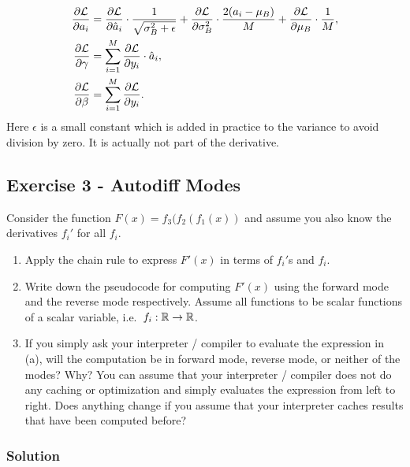 \documentclass[
  letterpaper,
  DIV=11,
  numbers=noendperiod]{scrartcl}
\begin{document}
\begin{enumerate}
\[\begin{aligned}
  \frac{\partial\mathcal{L}}{\partial a_i}
    &=
    \frac{\partial\mathcal{L}}{\partial\hat{a}_i}
    \cdot \frac{1}{\sqrt{\sigma_B^2+\epsilon}}  + \frac{\partial \mathcal{L}}{\partial \sigma_B^2} \cdot \frac{2(a_i-\mu_B)}{M} + \frac{\partial \mathcal{L}}{\partial \mu_B}\cdot \frac{1}{M},\\
  \frac{\partial\mathcal{L}}{\partial\gamma}&= \sum_{i=1}^M \frac{\partial\mathcal{L}}{\partial y_i} \cdot \hat{a}_i, \\ 
  \frac{\partial\mathcal{L}}{\partial\beta} &= \sum_{i=1}^M \frac{\partial\mathcal{L}}{\partial y_i}.
  \end{aligned}
  \] Here \(\epsilon\) is a small constant which is added in practice to
  the variance to avoid division by zero. It is actually not part of the
  derivative.
\end{enumerate}

\subsection{Exercise 3 - Autodiff
Modes}\label{exercise-3---autodiff-modes}

Consider the function \(F(x) = f_3(f_2(f_1(x))\) and assume you also
know the derivatives \(f_i'\) for all \(f_i\).

\begin{enumerate}
\def\labelenumi{(\alph{enumi})}
\item
  Apply the chain rule to express \(F'(x)\) in terms of \(f_i'\)s and
  \(f_i\).
\item
  Write down the pseudocode for computing \(F'(x)\) using the forward
  mode and the reverse mode respectively. Assume all functions to be
  scalar functions of a scalar variable,
  i.e.~\(f_i: \mathbb{R} \rightarrow \mathbb{R}\).
\item
  If you simply ask your interpreter / compiler to evaluate the
  expression in (a), will the computation be in forward mode, reverse
  mode, or neither of the modes? Why? You can assume that your
  interpreter / compiler does not do any caching or optimization and
  simply evaluates the expression from left to right. Does anything
  change if you assume that your interpreter caches results that have
  been computed before?
\end{enumerate}

\subsubsection{Solution}\label{solution-2}
\end{document}
